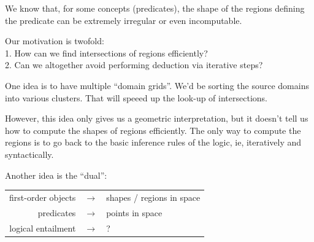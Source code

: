 We know that, for some concepts (predicates), the shape of the regions defining the predicate can be extremely irregular or even incomputable.

Our motivation is twofold:\\
1. How can we find intersections of regions efficiently?\\
2. Can we altogether avoid performing deduction via iterative steps?

One idea is to have multiple ``domain grids''.  We'd be sorting the source domains into various clusters.  That will speeed up the look-up of intersections.

However, this idea only gives us a geometric interpretation, but it doesn't tell us how to compute the shapes of regions efficiently.  The only way to compute the regions is to go back to the basic inference rules of the logic, ie, iteratively and syntactically.

Another idea is the ``dual'':

\tab \begin{tabular}{rll}
first-order objects & $\longrightarrow$ & shapes / regions in space\\
predicates          & $\longrightarrow$ & points in space\\
logical entailment  & $\longrightarrow$ & ?\\
\end{tabular}
